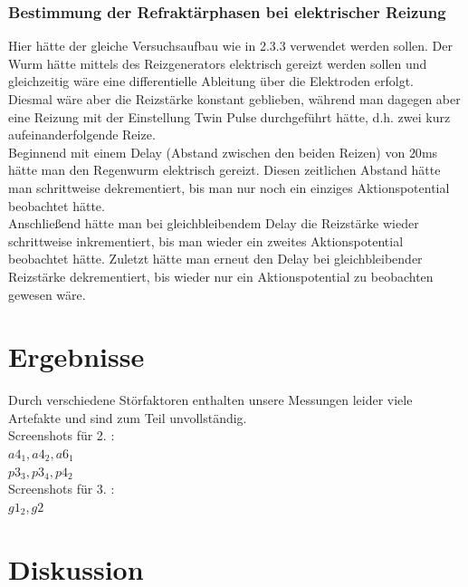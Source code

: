 \documentclass[11pt]{article}
\begin{document}
\subsubsection{Bestimmung der Refraktärphasen bei elektrischer Reizung}
Hier hätte der gleiche Versuchsaufbau wie in 2.3.3 verwendet werden sollen. Der Wurm hätte mittels des Reizgenerators elektrisch gereizt werden sollen und gleichzeitig wäre eine differentielle Ableitung über die Elektroden erfolgt. \\
Diesmal wäre aber die Reizstärke konstant geblieben, während man dagegen aber eine Reizung mit der Einstellung \glqq Twin Pulse\grqq{} durchgeführt hätte, d.h. zwei kurz aufeinanderfolgende Reize. \\
Beginnend mit einem Delay (Abstand zwischen den beiden Reizen) von $20$ms hätte man den Regenwurm elektrisch gereizt. Diesen zeitlichen Abstand hätte man schrittweise dekrementiert, bis man nur noch ein einziges Aktionspotential beobachtet hätte. \\
Anschließend hätte man bei gleichbleibendem Delay die Reizstärke wieder schrittweise inkrementiert, bis man wieder ein zweites Aktionspotential beobachtet hätte. Zuletzt hätte man erneut den Delay bei gleichbleibender Reizstärke dekrementiert, bis wieder nur ein Aktionspotential zu beobachten gewesen wäre. 


\section{Ergebnisse}
Durch verschiedene Störfaktoren enthalten unsere Messungen leider viele Artefakte und sind zum Teil unvollständig.  \\

Screenshots für 2. : \\
$a4_1, a4_2, a6_1$ \\
$p3_3, p3_4, p4_2 $\\

Screenshots für 3. : \\
$g1_2, g2$ \\

\section{Diskussion}
\end{document}
